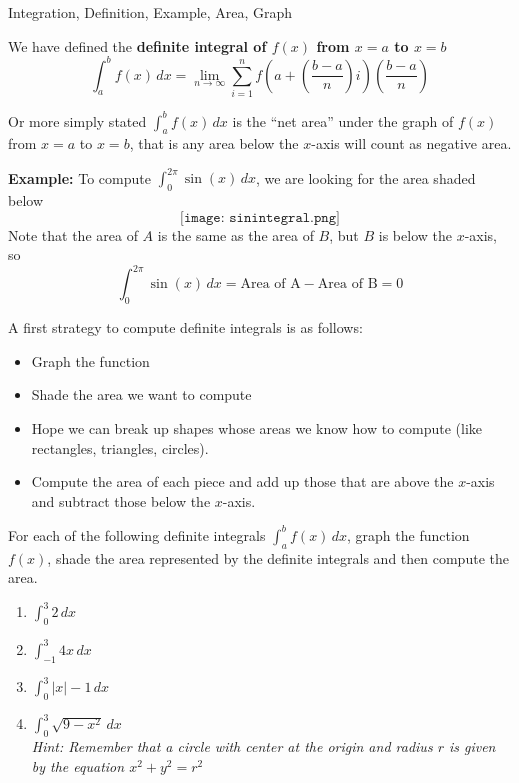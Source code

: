 \begin{tagblock}{Integration, Definition, Example, Area, Graph}
\begin{question}

We have defined the \textbf{definite integral of $f(x)$ from $x=a$ to $x=b$} 
\[ \int_a^b f(x) \, dx = \lim_{n \to \infty} \sum_{i=1}^n f\left(a+ \left(\frac{b-a}{n}\right) i \right)\left(\frac{b-a}{n}\right) \]

Or more simply stated $\int_a^b f(x) \, dx$ is the ``net area'' under the graph of $f(x)$ from $x=a$ to $x=b$, that is any area below the $x$-axis will count as negative area.  

\bigskip

\textbf{Example:} To compute $\int_0^{2\pi} \sin(x) \,dx$, we are looking for the area shaded below
\[ \texttt{[image: sinintegral.png]}\]
Note that the area of $A$ is the same as the area of $B$, but $B$ is below the $x$-axis, so 
\[ \int_0^{2\pi} \sin(x) \,dx = \text{Area of A} - \text{Area of B} = 0 \]

A first strategy to compute definite integrals is as follows:  
\begin{itemize}
\item Graph the function
\item Shade the area we want to compute 
\item Hope we can break up shapes whose areas we know how to compute (like rectangles, triangles, circles). 
\item Compute the area of each piece and add up those that are above the $x$-axis and subtract those below the $x$-axis.
\end{itemize}

\bigskip

For each of the following definite integrals $\int _a^b f(x) \, dx$, graph the function $f(x)$, shade the area represented by the definite integrals and then compute the area.
\begin{enumerate}
\item $\displaystyle \int_0^3 2 \, dx$
\vspace{1in}
\item $\displaystyle \int _{-1}^3 4x \, dx$
\vspace{2in}
\item $\displaystyle \int_{0}^3 |x| -1 \, dx$
\vspace{2in}
\item $\displaystyle \int_{0}^3 \sqrt{9-x^2} \, dx$ \\ \emph{Hint: Remember that a circle with center at the origin and radius $r$ is given by the equation $x^2+y^2=r^2$}


\end{enumerate}
\end{question}
\end{tagblock}
